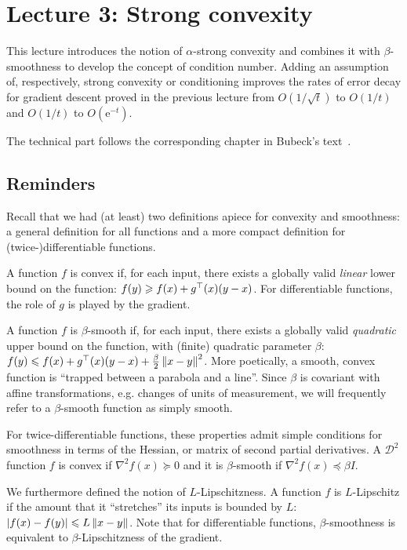 \section{Lecture 3: Strong convexity}

This lecture introduces the notion of $\alpha$-strong convexity and combines it
with $\beta$-smoothness to develop the concept of condition number.  Adding an
assumption of, respectively, strong convexity or conditioning improves the rates
of error decay for gradient descent proved in the previous lecture from
$O(1/\sqrt{t})$ to $O(1/t)$ and $O(1/t)$ to $O(\mathrm{e}^{-t})$.

The technical part follows the corresponding chapter in Bubeck's
text~\cite{Bubeck}.

\subsection{Reminders}

Recall that we had (at least) two definitions apiece for convexity and
smoothness: a general definition for all functions and a more compact definition
for (twice-)differentiable functions.

A function $f$ is convex if, for each input, there exists a globally valid
\emph{linear} lower bound on the function: $f(y) \geqslant f(x) + g^\top(x)(y-x)$.
For differentiable functions, the role of $g$ is played by the gradient.

A function $f$ is $\beta$-smooth if, for each input, there exists a globally
valid \emph{quadratic} upper bound on the function, with (finite) quadratic
parameter $\beta$: $f(y) \leqslant f(x) + g^\top(x)(y-x) +
\frac{\beta}{2}\left\lVert x-y\right\rVert^2$.  More poetically, a smooth, convex function is
``trapped between a parabola and a line''.  Since $\beta$ is covariant with
affine transformations, e.g. changes of units of measurement, we will frequently
refer to a $\beta$-smooth function as simply smooth.

For twice-differentiable functions, these properties admit simple conditions for
smoothness in terms of the Hessian, or matrix of second partial derivatives.  A
$\mathcal{D}^2$ function $f$ is convex if $\nabla^2f(x) \succeq 0$ and it is
$\beta$-smooth if $\nabla^2f(x) \preceq \beta I$.

We furthermore defined the notion of $L$-Lipschitzness.  A function $f$ is
$L$-Lipschitz if the amount that it ``stretches'' its inputs is bounded by $L$:
$\left\lvert f(x)-f(y)\right\rvert \leqslant L\left\lVert x-y\right\rVert$.  Note that for differentiable functions,
$\beta$-smoothness is equivalent to $\beta$-Lipschitzness of the gradient.

